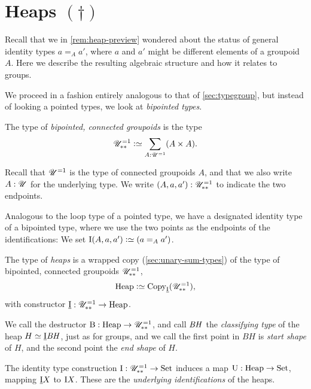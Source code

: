 \section{Heaps \texorpdfstring{$(\dagger)$}{(\textdagger)}}
\label{sec:heaps}

Recall that we in \cref{rem:heap-preview} wondered about
the status of general identity types $a=_A a'$,
where $a$ and $a'$ might be different elements of a groupoid $A$.
Here we describe the resulting algebraic structure
and how it relates to groups.

We proceed in a fashion entirely analogous to that of \cref{sec:typegroup},
but instead of looking a pointed types, we look at \emph{bipointed types}.

\begin{definition}\label{def:bipt-conn-groupoid}
  The type of \emph{bipointed, connected groupoids} is the type
  \[
    \UUppone \defeq \sum_{A:\UU^{=1}}(A \times A).
  \]
\end{definition}
Recall that ${\mathscr{U}}^{=1}$ is the type of connected groupoids $A$,
and that we also write $A:{\mathscr{U}}$ for the underlying type.
We write $(A,a,a'):{\mathscr{U}}_{{\ast}{\ast}}^{=1}$ to indicate the two endpoints.

Analogous to the loop type of a pointed type,
we have a designated identity type of a bipointed type,
where we use the two points as the endpoints of the identifications:
We set $\ISym(A,a,a') \defeq (a =_A a')$.

\begin{definition}\label{def:heap}
  The type of \emph{heaps} is a wrapped copy (\cf \cref{sec:unary-sum-types})
  of the type of bipointed, connected groupoids ${\mathscr{U}}_{{\ast}{\ast}}^{=1}$,
  \[
    \Heap \defeq \Copy_{\mkheap}(\UUppone),
  \]
  with constructor $\underline{\mathrm{I}} : {\mathscr{U}}_{{\ast}{\ast}}^{=1} \to \mathrm{Heap}$.
\end{definition}
We call the destructor $\mathrm{B} : \mathrm{Heap} \to {\mathscr{U}}_{{\ast}{\ast}}^{=1}$,
and call $\mathit{B}\mathit{H}$ the \emph{classifying type} of the heap $H \jdeq\mkheap\BH$,
just as for groups,
and we call the first point in $BH$ is \emph{start shape} of $H$,
and the second point the \emph{end shape} of $H$.

The identity type construction $\mathrm{I} : {\mathscr{U}}_{{\ast}{\ast}}^{=1} \to \mathrm{Set}$
induces a map $\mathrm{U} : \mathrm{Heap} \to \mathrm{Set}$,
mapping $\underline{\mathrm{I}} X$ to $\mathrm{I} X$.
These are the \emph{underlying identifications} of the heaps.

